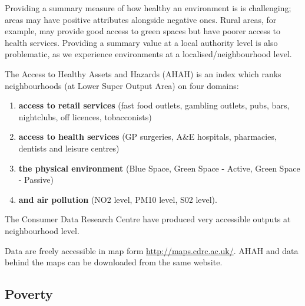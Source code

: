 Providing a summary measure of how healthy an environment is is challenging; areas may have positive attributes alongside negative ones. Rural areas, for example, may provide good access to green spaces but have poorer access to health services. Providing a summary value at a local authority level is also problematic, as we experience environments at a localised/neighbourhood level.

The Access to Healthy Assets and Hazards (AHAH) is an index which ranks neighbourhoods (at Lower Super Output Area) on four domains:
\begin{enumerate}[noitemsep]
    \item {\bf access to retail services} (fast food outlets, gambling outlets, pubs, bars, nightclubs, off licences, tobacconists)
    \item {\bf access to health services} (GP surgeries, A\&E hospitals, pharmacies, dentists and leisure centres)
    \item {\bf the physical environment} (Blue Space, Green Space - Active, Green Space - Passive)
    \item {\bf and air pollution} (NO2 level, PM10 level, S02 level).
\end{enumerate}
The Consumer Data Research Centre have produced very accessible outputs at neighbourhood level.

Data are freely accessible in map form \url{http://maps.cdrc.ac.uk/}. AHAH and data behind the maps can be downloaded from the same website.


\subsection{Poverty}
